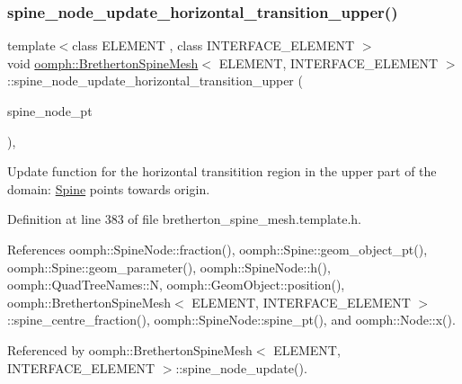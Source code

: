 \subsubsection{\texorpdfstring{spine\+\_\+node\+\_\+update\+\_\+horizontal\+\_\+transition\+\_\+upper()}{spine\_node\_update\_horizontal\_transition\_upper()}}
{\footnotesize\ttfamily template$<$class E\+L\+E\+M\+E\+NT , class I\+N\+T\+E\+R\+F\+A\+C\+E\+\_\+\+E\+L\+E\+M\+E\+NT $>$ \\
void \hyperlink{classoomph_1_1BrethertonSpineMesh}{oomph\+::\+Bretherton\+Spine\+Mesh}$<$ E\+L\+E\+M\+E\+NT, I\+N\+T\+E\+R\+F\+A\+C\+E\+\_\+\+E\+L\+E\+M\+E\+NT $>$\+::spine\+\_\+node\+\_\+update\+\_\+horizontal\+\_\+transition\+\_\+upper (\begin{DoxyParamCaption}\item[{\hyperlink{classoomph_1_1SpineNode}{Spine\+Node} $\ast$}]{spine\+\_\+node\+\_\+pt }\end{DoxyParamCaption})\hspace{0.3cm}{\ttfamily [inline]}, {\ttfamily [protected]}}



Update function for the horizontal transitition region in the upper part of the domain\+: \hyperlink{classoomph_1_1Spine}{Spine} points towards origin. 



Definition at line 383 of file bretherton\+\_\+spine\+\_\+mesh.\+template.\+h.



References oomph\+::\+Spine\+Node\+::fraction(), oomph\+::\+Spine\+::geom\+\_\+object\+\_\+pt(), oomph\+::\+Spine\+::geom\+\_\+parameter(), oomph\+::\+Spine\+Node\+::h(), oomph\+::\+Quad\+Tree\+Names\+::N, oomph\+::\+Geom\+Object\+::position(), oomph\+::\+Bretherton\+Spine\+Mesh$<$ E\+L\+E\+M\+E\+N\+T, I\+N\+T\+E\+R\+F\+A\+C\+E\+\_\+\+E\+L\+E\+M\+E\+N\+T $>$\+::spine\+\_\+centre\+\_\+fraction(), oomph\+::\+Spine\+Node\+::spine\+\_\+pt(), and oomph\+::\+Node\+::x().



Referenced by oomph\+::\+Bretherton\+Spine\+Mesh$<$ E\+L\+E\+M\+E\+N\+T, I\+N\+T\+E\+R\+F\+A\+C\+E\+\_\+\+E\+L\+E\+M\+E\+N\+T $>$\+::spine\+\_\+node\+\_\+update().

\mbox{\label{classoomph_1_1BrethertonSpineMesh_a9ec578183760e386ed5229ba193e1fdf}} 
